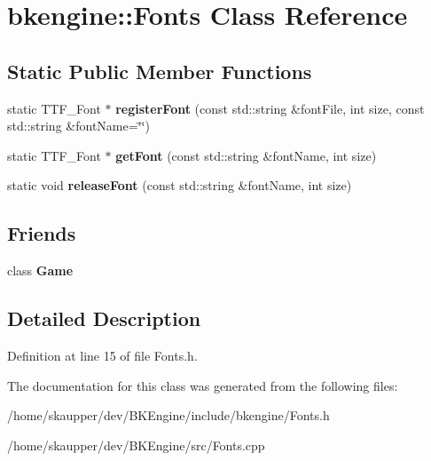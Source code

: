 \hypertarget{classbkengine_1_1Fonts}{}\section{bkengine\+:\+:Fonts Class Reference}
\label{classbkengine_1_1Fonts}
\subsection*{Static Public Member Functions}
\begin{DoxyCompactItemize}
\item 
\mbox{\label{classbkengine_1_1Fonts_a5690d3d95ae99ebab8f5598a81fce92f}} 
static T\+T\+F\+\_\+\+Font $\ast$ {\bfseries register\+Font} (const std\+::string \&font\+File, int size, const std\+::string \&font\+Name=\char`\"{}\char`\"{})
\item 
\mbox{\label{classbkengine_1_1Fonts_a87f4f938ffe851562cf930206daf8898}} 
static T\+T\+F\+\_\+\+Font $\ast$ {\bfseries get\+Font} (const std\+::string \&font\+Name, int size)
\item 
\mbox{\label{classbkengine_1_1Fonts_a2462498df69b120920e5258ad9c8f08d}} 
static void {\bfseries release\+Font} (const std\+::string \&font\+Name, int size)
\end{DoxyCompactItemize}
\subsection*{Friends}
\begin{DoxyCompactItemize}
\item 
\mbox{\label{classbkengine_1_1Fonts_aa2fab026580d6f14280c2ffb8063a314}} 
class {\bfseries Game}
\end{DoxyCompactItemize}


\subsection{Detailed Description}


Definition at line 15 of file Fonts.\+h.



The documentation for this class was generated from the following files\+:\begin{DoxyCompactItemize}
\item 
/home/skaupper/dev/\+B\+K\+Engine/include/bkengine/Fonts.\+h\item 
/home/skaupper/dev/\+B\+K\+Engine/src/Fonts.\+cpp\end{DoxyCompactItemize}
